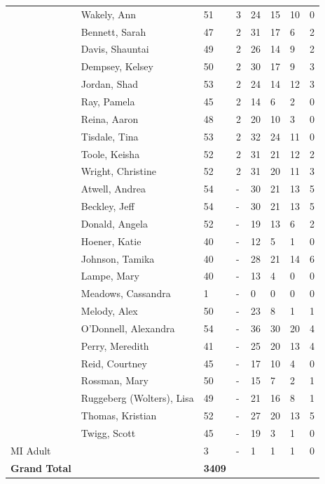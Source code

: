 \documentclass{article}\usepackage[]{graphicx}\usepackage[]{color}
\begin{document}
{\begin{longtable} { >{\raggedright}p{}p{}p{}p{}p{}p{}p{}p{}}
   \rowcolor[gray]{0.90} & Wakely, Ann & 51 & 3 & 24 & 15 & 10 & 0 \\ 
   \rowcolor[gray]{0.90} & Bennett, Sarah & 47 & 2 & 31 & 17 & 6 & 2 \\ 
   \rowcolor[gray]{0.90} & Davis, Shauntai & 49 & 2 & 26 & 14 & 9 & 2 \\ 
   & Dempsey, Kelsey & 50 & 2 & 30 & 17 & 9 & 3 \\ 
   & Jordan, Shad & 53 & 2 & 24 & 14 & 12 & 3 \\ 
   & Ray, Pamela & 45 & 2 & 14 & 6 & 2 & 0 \\ 
   \rowcolor[gray]{0.90} & Reina, Aaron & 48 & 2 & 20 & 10 & 3 & 0 \\ 
   \rowcolor[gray]{0.90} & Tisdale, Tina & 53 & 2 & 32 & 24 & 11 & 0 \\ 
   \rowcolor[gray]{0.90} & Toole, Keisha & 52 & 2 & 31 & 21 & 12 & 2 \\ 
   & Wright, Christine & 52 & 2 & 31 & 20 & 11 & 3 \\ 
   & Atwell, Andrea & 54 & - & 30 & 21 & 13 & 5 \\ 
   & Beckley, Jeff & 54 & - & 30 & 21 & 13 & 5 \\ 
   \rowcolor[gray]{0.90} & Donald, Angela & 52 & - & 19 & 13 & 6 & 2 \\ 
   \rowcolor[gray]{0.90} & Hoener, Katie & 40 & - & 12 & 5 & 1 & 0 \\ 
   \rowcolor[gray]{0.90} & Johnson, Tamika & 40 & - & 28 & 21 & 14 & 6 \\ 
   & Lampe, Mary & 40 & - & 13 & 4 & 0 & 0 \\ 
   & Meadows, Cassandra & 1 & - & 0 & 0 & 0 & 0 \\ 
   & Melody, Alex & 50 & - & 23 & 8 & 1 & 1 \\ 
   \rowcolor[gray]{0.90} & O'Donnell, Alexandra & 54 & - & 36 & 30 & 20 & 4 \\ 
   \rowcolor[gray]{0.90} & Perry, Meredith & 41 & - & 25 & 20 & 13 & 4 \\ 
   \rowcolor[gray]{0.90} & Reid, Courtney & 45 & - & 17 & 10 & 4 & 0 \\ 
   & Rossman, Mary & 50 & - & 15 & 7 & 2 & 1 \\ 
   & Ruggeberg (Wolters), Lisa & 49 & - & 21 & 16 & 8 & 1 \\ 
   & Thomas, Kristian & 52 & - & 27 & 20 & 13 & 5 \\ 
   \rowcolor[gray]{0.90} & Twigg, Scott & 45 & - & 19 & 3 & 1 & 0 \\ 
   \hline
MI Adult &  & 3 & - & 1 & 1 & 1 & 0 \\ 
   \hline
\hline
\textbf{Grand Total} &  & \textbf{ 3409 } &  & {\textbf{1612} & {\textbf{937} & {\textbf{505} & {\textbf{106} \\ 
   \end{longtable}

}
\end{document}
